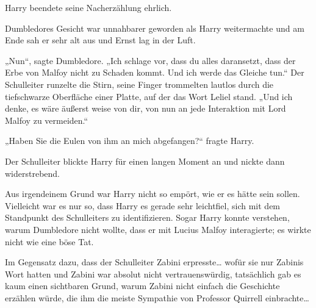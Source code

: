 Harry beendete seine Nacherzählung ehrlich.

Dumbledores Gesicht war unnahbarer geworden als Harry weitermachte und am Ende sah er sehr alt aus und Ernst lag in der Luft.

„Nun“, sagte Dumbledore. „Ich schlage vor, dass du alles daransetzt, dass der Erbe von Malfoy nicht zu Schaden kommt. Und ich werde das Gleiche tun.“ Der Schulleiter runzelte die Stirn, seine Finger trommelten lautlos durch die tiefschwarze Oberfläche einer Platte, auf der das Wort Leliel stand. „Und ich denke, es wäre äußerst weise von dir, von nun an jede Interaktion mit Lord Malfoy zu vermeiden.“

„Haben Sie die Eulen von ihm an mich abgefangen?“ fragte Harry.

Der Schulleiter blickte Harry für einen langen Moment an und nickte dann widerstrebend.

Aus irgendeinem Grund war Harry nicht so empört, wie er es hätte sein sollen. Vielleicht war es nur so, dass Harry es gerade sehr leichtfiel, sich mit dem Standpunkt des Schulleiters zu identifizieren. Sogar Harry konnte verstehen, warum Dumbledore nicht wollte, dass er mit Lucius Malfoy interagierte; es wirkte nicht wie eine böse Tat.

Im Gegensatz dazu, dass der Schulleiter Zabini erpresste… wofür sie nur Zabinis Wort hatten und Zabini war absolut nicht vertrauenswürdig, tatsächlich gab es kaum einen sichtbaren Grund, warum Zabini nicht einfach die Geschichte erzählen würde, die ihm die meiste Sympathie von Professor Quirrell einbrachte…

